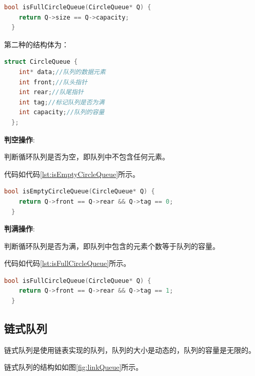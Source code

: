 \documentclass[lang=cn,newtx,10pt,scheme=chinese]{elegantbook}
\begin{document}
\begin{lstlisting}[language=C++, caption={判断循环队列是否为满示例代码}, label={lst:isFullCircleQueue}]
  bool isFullCircleQueue(CircleQueue* Q) {
    return Q->size == Q->capacity;
  }

\end{lstlisting}

第二种的结构体为：

\begin{lstlisting}[language=C++, caption={循环队列结构体定义}, label={lst:circleQueueStruct}]
  struct CircleQueue {
    int* data;//队列的数据元素
    int front;//队头指针
    int rear;//队尾指针
    int tag;//标记队列是否为满
    int capacity;//队列的容量
  };
\end{lstlisting}

\textbf{判空操作}:

判断循环队列是否为空，即队列中不包含任何元素。

代码如代码\ref{lst:isEmptyCircleQueue}所示。

\begin{lstlisting}[language=C++, caption={判断循环队列是否为空示例代码}, label={lst:isEmptyCircleQueue}]
  bool isEmptyCircleQueue(CircleQueue* Q) {
    return Q->front == Q->rear && Q->tag == 0;
  }

\end{lstlisting}

\textbf{判满操作}:

判断循环队列是否为满，即队列中包含的元素个数等于队列的容量。

代码如代码\ref{lst:isFullCircleQueue}所示。

\begin{lstlisting}[language=C++, caption={判断循环队列是否为满示例代码}, label={lst:isFullCircleQueue}]
  bool isFullCircleQueue(CircleQueue* Q) {
    return Q->front == Q->rear && Q->tag == 1;
  }

\end{lstlisting}

\subsection{链式队列}

链式队列是使用链表实现的队列，队列的大小是动态的，队列的容量是无限的。

链式队列的结构如如图\ref{fig:linkQueue}所示。
\end{document}
